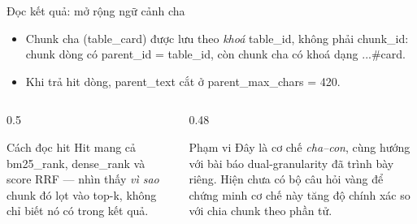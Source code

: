 \documentclass[aspectratio=169,11pt]{beamer}
\newcommand{\src}[1]{{\footnotesize\ttfamily #1}}
\begin{document}
\begin{frame}{Đọc kết quả: mở rộng ngữ cảnh cha}
  \begin{itemize}\small
    \item Chunk cha (\src{table\_card}) được lưu theo \emph{khoá} \src{table\_id},
          không phải \src{chunk\_id}: chunk dòng có \src{parent\_id = table\_id},
          còn chunk cha có khoá dạng \src{...\#card}.
    \item Khi trả hit dòng, \src{parent\_text} cắt ở \src{parent\_max\_chars = 420}.
  \end{itemize}
  \begin{columns}[T]
    \begin{column}{0.5\textwidth}
      \begin{block}{\small Cách đọc hit}
        \src{Hit} mang cả \src{bm25\_rank}, \src{dense\_rank} và \src{score} RRF —
        nhìn thấy \emph{vì sao} chunk đó lọt vào top-k, không chỉ biết nó có trong kết quả.
      \end{block}
    \end{column}
    \begin{column}{0.48\textwidth}
      \begin{alertblock}{\small Phạm vi}
        Đây là cơ chế \emph{cha--con}, cùng hướng với bài báo dual-granularity đã
        trình bày riêng. Hiện chưa có bộ câu hỏi vàng để chứng minh cơ chế này
        tăng độ chính xác so với chia chunk theo phần tử.
      \end{alertblock}
    \end{column}
  \end{columns}
\end{frame}
\end{document}
